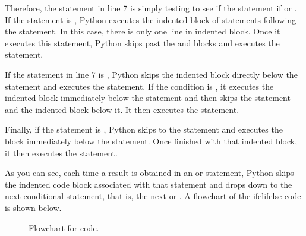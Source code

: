 \documentclass[letterpaper,10pt,english]{sphinxmanual}
\begin{document}
\sphinxAtStartPar
Therefore, the  statement in line 7 is simply testing to see if the statement  if  or .  If the statement is , Python executes the indented block of statements following the  statement.  In this case, there is only one line in indented block.  Once it executes this statement, Python skips past the  and  blocks and executes the  statement.

\sphinxAtStartPar
If the  statement in line 7 is , Python skips the indented block directly below the  statement and executes the  statement.  If the condition  is , it executes the indented block immediately below the  statement and then skips the  statement and the indented block below it.  It then executes the  statement.

\sphinxAtStartPar
Finally, if the  statement is , Python skips to the  statement and executes the block immediately below the  statement.  Once finished with that indented block, it then executes the  statement.

\sphinxAtStartPar
As you can see, each time a  result is obtained in an  or  statement, Python skips the indented code block associated with that  statement and drops down to the next conditional statement, that is, the next  or .  A flowchart of the if\sphinxhyphen{}elif\sphinxhyphen{}else code is shown below.

\begin{figure}[htbp]
\centering
\capstart

\noindent{}
\caption{Flowchart for \sphinxhyphen{}\sphinxhyphen{} code.}\label{\detokenize{chap6/chap6_loopsconds:id1}}\label{\detokenize{chap6/chap6_loopsconds:fig-flow-if-elif-else}}\end{figure}
\end{document}
